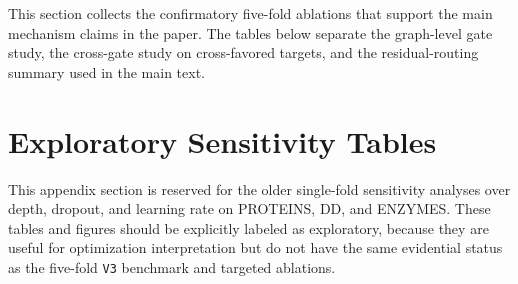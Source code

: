 This section collects the confirmatory five-fold ablations that support the main mechanism claims in the paper. The tables below separate the graph-level gate study, the cross-gate study on cross-favored targets, and the residual-routing summary used in the main text.



\section{Exploratory Sensitivity Tables}
\label{app:sensitivity}

This appendix section is reserved for the older single-fold sensitivity analyses over depth, dropout, and learning rate on PROTEINS, DD, and ENZYMES. These tables and figures should be explicitly labeled as exploratory, because they are useful for optimization interpretation but do not have the same evidential status as the five-fold \texttt{V3} benchmark and targeted ablations.
